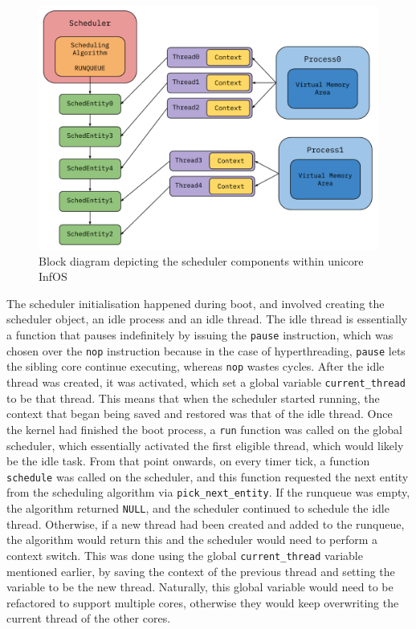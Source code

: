 \documentclass[bsc,frontabs,singlespacing,parskip,deptreport]{infthesis}
\begin{document}
\begin{figure}[h]
    \centering
    \includegraphics[scale=0.7]{figures/schedulers.pdf}
    \caption{Block diagram depicting the scheduler components within unicore InfOS}
    \label{schedulers}
\end{figure}

The scheduler initialisation happened during boot, and involved creating the scheduler object, an idle process and an idle thread. The idle thread is essentially a function that pauses indefinitely by issuing the \verb|pause| instruction, which was chosen over the \verb|nop| instruction because in the case of hyperthreading,  \verb|pause| lets the sibling core continue executing, whereas \verb|nop| wastes cycles. After the idle thread was created, it was activated, which set a global variable \verb|current_thread| to be that thread. This means that when the scheduler started running, the context that began being saved and restored was that of the idle thread. Once the kernel had finished the boot process, a \verb|run| function was called on the global scheduler, which essentially activated the first eligible thread, which would likely be the idle task. From that point onwards, on every timer tick, a function \verb|schedule| was called on the scheduler, and this function requested the next entity from the scheduling algorithm via \verb|pick_next_entity|. If the runqueue was empty, the algorithm returned \verb|NULL|, and the scheduler continued to schedule the idle thread. Otherwise, if a new thread had been created and added to the runqueue, the algorithm would return this and the scheduler would need to perform a context switch. This was done using the global \verb|current_thread| variable mentioned earlier, by saving the context of the previous thread and setting the variable to be the new thread. Naturally, this global variable would need to be refactored to support multiple cores, otherwise they would keep overwriting the current thread of the other cores.
\end{document}

